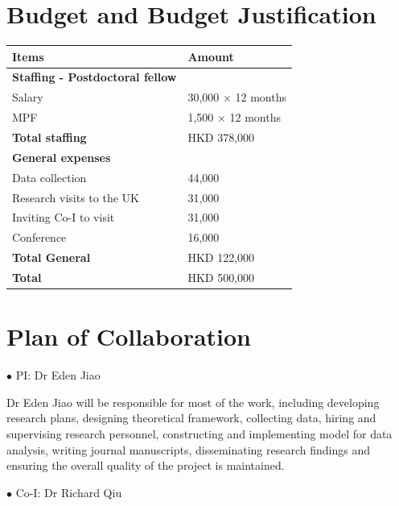 \documentclass[11pt,a4paper]{amsart}
\theoremstyle{plain}
\theoremstyle{definition}
\begin{document}
\section{Budget and Budget Justification}
\begin{singlespace}
	\begin{table}[H] 
			\begin{center}
				\begin{NiceTabular*}{\linewidth}{@{\extracolsep{\fill}}ll}
				\toprule
				Items & Amount\\
				\midrule
				\textbf{Staffing - Postdoctoral fellow} & \\
				\phantom{ZZ} Salary  & 30,000 $\times$ 12 months\\
				\phantom{ZZ} MPF & 1,500 $\times$ 12 months\\
				\textbf{Total staffing} & HKD 378,000 \\
				\textbf{General expenses} & \\
				\phantom{ZZ} Data collection & 44,000 \\
				\phantom{ZZ} Research visits to the UK & 31,000 \\
				\phantom{ZZ} Inviting Co-I to visit & 31,000 \\
				\phantom{ZZ} Conference & 16,000 \\
				\textbf{Total General} & HKD 122,000 \\
				\textbf{Total} & HKD 500,000 \\
				\bottomrule
				\end{NiceTabular*}
			\end{center}
	\end{table}
\end{singlespace}
\newpage

\section{Plan of Collaboration}
$\bullet$ PI: Dr Eden Jiao

\noindent Dr Eden Jiao will be responsible for most of the work, including developing research plans, designing theoretical framework, collecting data, hiring and supervising research personnel, constructing and implementing model for data analysis, writing journal manuscripts, disseminating research findings and ensuring the overall quality of the project is maintained. 
\vspace{3pt}

$\bullet$ Co-I: Dr Richard Qiu
\end{document}
